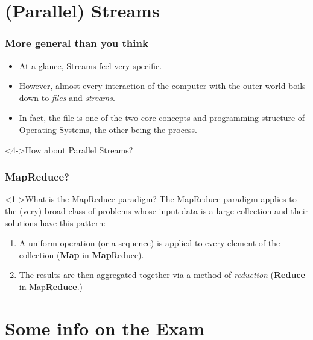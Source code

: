\documentclass[xcolor={dvipsnames,svgnames},aspectratio=169]{beamer}
\begin{document}
\section{(Parallel) Streams}

\begin{frame}[fragile]
  \frametitle{More general than you think}
  \begin{itemize}
  \item[\faBook]<1-> At a glance, Streams feel very specific.
  \item[\faBook]<2-> However, almost every interaction of the computer with the
    outer world boils down to \emph{files} and \emph{streams}.
  \item[\faBook]<3-> In fact, the file is one of the two core
    concepts and programming structure of Operating Systems, the other being the process.
  \end{itemize}

  \vspace{0.6cm}

  \begin{block}<4->{\faLightbulb \quad How about Parallel Streams?}
  \end{block}
\end{frame}

\begin{frame}[fragile]
  \frametitle{MapReduce?}

  \begin{block}<1->{\faLightbulb \quad What is the MapReduce paradigm?}
    The MapReduce paradigm applies to the (very) broad class of problems whose
    input data is a large collection and their solutions have this pattern:
    \begin{enumerate}
    \item A uniform operation (or a sequence) is applied to every element
      of the collection (\textbf{Map} in \textbf{Map}Reduce).
    \item The results are then aggregated together via a method of
      \emph{reduction} (\textbf{Reduce} in Map\textbf{Reduce}.)
    \end{enumerate}
  \end{block}

\end{frame}

\section{Some info on the Exam}
\end{document}

